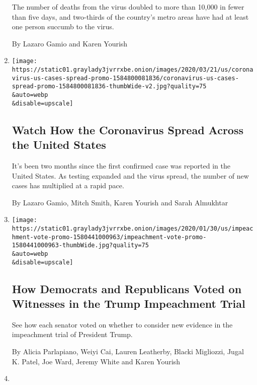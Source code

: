 \begin{enumerate}
  The number of deaths from the virus doubled to more than 10,000 in
  fewer than five days, and two-thirds of the country's metro areas have
  had at least one person succumb to the virus.

  By Lazaro Gamio and Karen Yourish
\item
  \href{/interactive/2020/03/21/us/coronavirus-us-cases-spread.html}{}

  \texttt{[image: https://static01.graylady3jvrrxbe.onion/images/2020/03/21/us/coronavirus-us-cases-spread-promo-1584800081836/coronavirus-us-cases-spread-promo-1584800081836-thumbWide-v2.jpg?quality=75\\\&auto=webp\\\&disable=upscale]}

  \hypertarget{watch-how-the-coronavirus-spread-across-the-united-states}{%
  \subsection{Watch How the Coronavirus Spread Across the United
  States}\label{watch-how-the-coronavirus-spread-across-the-united-states}}

  It's been two months since the first confirmed case was reported in
  the United States. As testing expanded and the virus spread, the
  number of new cases has multiplied at a rapid pace.

  By Lazaro Gamio, Mitch Smith, Karen Yourish and Sarah Almukhtar
\item
  \href{/interactive/2020/01/31/us/politics/impeachment-vote.html}{}

  \texttt{[image: https://static01.graylady3jvrrxbe.onion/images/2020/01/30/us/impeachment-vote-promo-1580441000963/impeachment-vote-promo-1580441000963-thumbWide.jpg?quality=75\\\&auto=webp\\\&disable=upscale]}

  \hypertarget{how-democrats-and-republicans-voted-on-witnesses-in-the-trump-impeachment-trial}{%
  \subsection{How Democrats and Republicans Voted on Witnesses in the
  Trump Impeachment
  Trial}\label{how-democrats-and-republicans-voted-on-witnesses-in-the-trump-impeachment-trial}}

  See how each senator voted on whether to consider new evidence in the
  impeachment trial of President Trump.

  By Alicia Parlapiano, Weiyi Cai, Lauren Leatherby, Blacki Migliozzi,
  Jugal K. Patel, Joe Ward, Jeremy White and Karen Yourish
\item
  \href{/interactive/2019/12/20/us/politics/senators-impeachment-reactions.html}{}


\end{enumerate}
